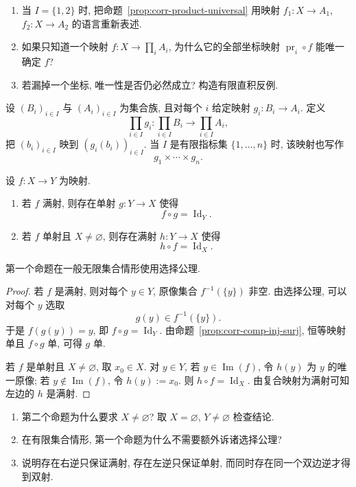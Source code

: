 \documentclass[usesamecnt, thmcnt=section, lang=cn, newtx, 10pt, scheme=chinese]{elegantbook}
\begin{document}
\begin{exercise}\label{ex:corr-product-universal}
\begin{enumerate}[label=\rm(\arabic*)]
  \item 当 $I=\{1,2\}$ 时, 把命题~\ref{prop:corr-product-universal} 用映射 $f_1:X\to A_1$, $f_2:X\to A_2$ 的语言重新表述.
  \item 如果只知道一个映射 $f:X\to\prod_iA_i$, 为什么它的全部坐标映射 $\operatorname{pr}_i\circ f$ 能唯一确定 $f$?
  \item 若漏掉一个坐标, 唯一性是否仍必然成立? 构造有限直积反例.
\end{enumerate}
\end{exercise}

\begin{notation}[映射的直积]
设 $(B_i)_{i\in I}$ 与 $(A_i)_{i\in I}$ 为集合族, 且对每个 $i$ 给定映射 $g_i:B_i\to A_i$. 定义
\[
 \prod_{i\in I}g_i:
 \prod_{i\in I}B_i\longrightarrow\prod_{i\in I}A_i,
\]
把 $(b_i)_{i\in I}$ 映到 $(g_i(b_i))_{i\in I}$. 当 $I$ 是有限指标集 $\{1,\ldots,n\}$ 时, 该映射也写作
\[
 g_1\times\cdots\times g_n.
\]
\end{notation}

\begin{proposition}\label{prop:corr-one-sided-inverse}
设 $f:X\to Y$ 为映射.
\begin{enumerate}[label=\rm(\arabic*)]
  \item 若 $f$ 满射, 则存在单射 $g:Y\to X$ 使得
  \[
   f\circ g=\operatorname{Id}_Y.
  \]
  \item 若 $f$ 单射且 $X\neq\varnothing$, 则存在满射 $h:Y\to X$ 使得
  \[
   h\circ f=\operatorname{Id}_X.
  \]
\end{enumerate}
第一个命题在一般无限集合情形使用选择公理.
\end{proposition}

\begin{proof}
若 $f$ 是满射, 则对每个 $y\in Y$, 原像集合 $f^{-1}(\{y\})$ 非空. 由选择公理, 可以对每个 $y$ 选取
\[
 g(y)\in f^{-1}(\{y\}).
\]
于是 $f(g(y))=y$, 即 $f\circ g=\operatorname{Id}_Y$. 由命题~\ref{prop:corr-comp-inj-surj}, 恒等映射单且 $f\circ g$ 单, 可得 $g$ 单.

若 $f$ 是单射且 $X\neq\varnothing$, 取 $x_0\in X$. 对 $y\in Y$, 若 $y\in\operatorname{Im}(f)$, 令 $h(y)$ 为 $y$ 的唯一原像; 若 $y\notin\operatorname{Im}(f)$, 令 $h(y):=x_0$. 则 $h\circ f=\operatorname{Id}_X$. 由复合映射为满射可知左边的 $h$ 是满射.
\end{proof}

\begin{exercise}\label{ex:corr-one-sided-inverse}
\begin{enumerate}[label=\rm(\arabic*)]
  \item 第二个命题为什么要求 $X\neq\varnothing$? 取 $X=\varnothing$, $Y\neq\varnothing$ 检查结论.
  \item 在有限集合情形, 第一个命题为什么不需要额外诉诸选择公理?
  \item 说明存在右逆只保证满射, 存在左逆只保证单射, 而同时存在同一个双边逆才得到双射.
\end{enumerate}
\end{exercise}
\end{document}
